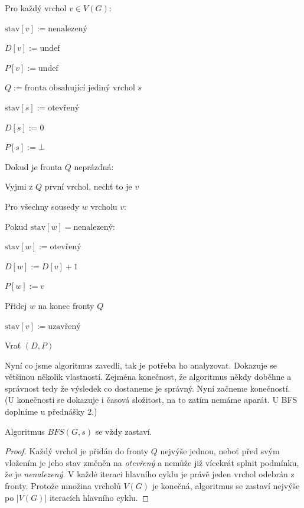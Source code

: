 \bigskip

\begin{pseudocode}
\item Pro každý vrchol $v \in V(G)$:
\item \tab $\text{stav}[v] := \text{nenalezený}$
\item \tab $D[v] := \text{undef}$
\item \tab $P[v] := \text{undef}$
\item $Q := \text{fronta obsahující jediný vrchol } s$
\item $\text{stav}[s] := \text{otevřený}$
\item $D[s] := 0$
\item $P[s] := \bot$
\item Dokud je fronta $Q$ neprázdná:
\item \tab Vyjmi z $Q$ první vrchol, nechť to je $v$
\item \tab Pro všechny sousedy $w$ vrcholu $v$:
\item \tab \tab Pokud $\text{stav}[w] = \text{nenalezený}$:
\item \tab \tab \tab $\text{stav}[w] := \text{otevřený}$
\item \tab \tab \tab $D[w] := D[v] + 1$
\item \tab \tab \tab $P[w] := v$
\item \tab \tab \tab Přidej $w$ na konec fronty $Q$
\item \tab $\text{stav}[v] := \text{uzavřený}$
\item Vrať $(D, P)$
\end{pseudocode} 

\bigskip

\noindent Nyní co jsme algoritmus zavedli, tak je potřeba ho analyzovat. Dokazuje se většinou několik vlastností. Zejména konečnost, že algoritmus někdy doběhne a správnost tedy že výsledek co dostaneme je správný. Nyní začneme konečností. (U konečnosti se dokazuje i časová složitost, na to zatím nemáme aparát. U BFS doplníme u přednášky 2.) \bigskip

\begin{theorem}
Algoritmus $BFS(G, s)$ se vždy zastaví.
\end{theorem}

\begin{proof}
Každý vrchol je přidán do fronty $Q$ nejvýše jednou, neboť před svým vložením je jeho stav změněn na \textit{otevřený} a nemůže již vícekrát splnit podmínku, že je \textit{nenalezený}. V každé iteraci hlavního cyklu je právě jeden vrchol odebrán z fronty. Protože množina vrcholů $V(G)$ je konečná, algoritmus se zastaví nejvýše po $|V(G)|$ iteracích hlavního cyklu.
\end{proof} \bigskip

